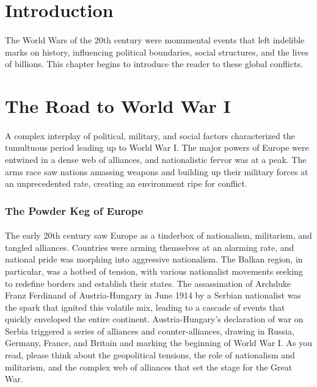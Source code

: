 \documentclass{book}
\begin{document}
\section*{Introduction}
\paragraph{}
The World Wars of the 20th century were monumental events that left indelible marks on history, influencing political boundaries, social structures, and the lives of billions. This chapter begins to introduce the reader to these global conflicts.

\section*{The Road to World War I}
\paragraph{}
A complex interplay of political, military, and social factors characterized the tumultuous period leading up to World War I. The major powers of Europe were entwined in a dense web of alliances, and nationalistic fervor was at a peak. The arms race saw nations amassing weapons and building up their military forces at an unprecedented rate, creating an environment ripe for conflict.

\subsubsection*{The Powder Keg of Europe}
\paragraph{}
The early 20th century saw Europe as a tinderbox of nationalism, militarism, and tangled alliances. Countries were arming themselves at an alarming rate, and national pride was morphing into aggressive nationalism. The Balkan region, in particular, was a hotbed of tension, with various nationalist movements seeking to redefine borders and establish their states. The assassination of Archduke Franz Ferdinand of Austria-Hungary in June 1914 by a Serbian nationalist was the spark that ignited this volatile mix, leading to a cascade of events that quickly enveloped the entire continent. Austria-Hungary's declaration of war on Serbia triggered a series of alliances and counter-alliances, drawing in Russia, Germany, France, and Britain and marking the beginning of World War I. As you read, please think about the geopolitical tensions, the role of nationalism and militarism, and the complex web of alliances that set the stage for the Great War.
\end{document}
